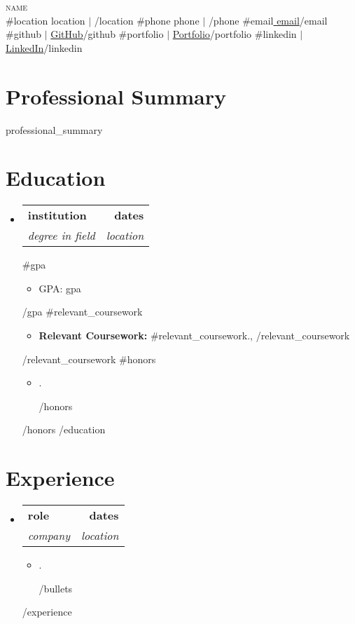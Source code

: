 \documentclass[letterpaper,11pt]{article}
\makeatletter
\newcommand{\resumeItem}[1]{
  \item\small{
    {#1 \vspace{-2pt}}
  }
}
\newcommand{\resumeSubheading}[4]{
  \vspace{-2pt}\item
    \begin{tabular*}{1.0\textwidth}[t]{l@{\extracolsep{\fill}}r}
      \textbf{#1} & \textbf{\small #2} \\
      \textit{\small#3} & \textit{\small #4} \\
    \end{tabular*}\vspace{-7pt}
}
\newcommand{\resumeSubHeadingListStart}{\begin{itemize}[leftmargin=0.0in, label={}]}
\newcommand{\resumeSubHeadingListEnd}{\end{itemize}}
\newcommand{\resumeItemListStart}{\begin{itemize}}
\newcommand{\resumeItemListEnd}{\end{itemize}\vspace{-5pt}}
\makeatother
\begin{document}
\begin{center}
    {\Huge \scshape {{name}}} \\ \vspace{1pt}
    \small
    {{#location}}\faMapMarker* \hspace{1pt} {{location}} $|$ {{/location}}
    {{#phone}}\faPhone* \hspace{1pt} {{phone}} $|$ {{/phone}}
    {{#email}}\href{mailto:{{email}}}{\faEnvelope \hspace{1pt} {{email}}}{{/email}}
    {{#github}} $|$ \href{ {{github}} }{\faGithub \hspace{1pt} GitHub}{{/github}}
    {{#portfolio}} $|$ \href{ {{portfolio}} }{\faGlobe \hspace{1pt} Portfolio}{{/portfolio}}
    {{#linkedin}} $|$ \href{ {{linkedin}} }{\faLinkedin \hspace{1pt} LinkedIn}{{/linkedin}}
    \vspace{-8pt}
\end{center}

\section{Professional Summary}
\small{
{{professional_summary}}
}
\vspace{-5pt}

\section{Education}
  \resumeSubHeadingListStart
    {{#education}}
    \resumeSubheading
      { {{institution}} }{ {{dates}} }
      { {{degree}} in {{field}} }{ {{location}} }
      {{#gpa}}
      \resumeItemListStart
        \resumeItem{GPA: {{gpa}}}
      \resumeItemListEnd
      {{/gpa}}
      {{#relevant_coursework}}
      \resumeItemListStart
        \resumeItem{\textbf{Relevant Coursework:} {{#relevant_coursework}}{{.}}, {{/relevant_coursework}}}
      \resumeItemListEnd
      {{/relevant_coursework}}
      {{#honors}}
      \resumeItemListStart
        {{#honors}}
        \resumeItem{ {{.}} }
        {{/honors}}
      \resumeItemListEnd
      {{/honors}}
    {{/education}}
  \resumeSubHeadingListEnd
\vspace{-10pt}

\section{Experience}
  \resumeSubHeadingListStart
    {{#experience}}
    \resumeSubheading
      { {{role}} }{ {{dates}} }
      { {{company}} }{ {{location}} }
      \resumeItemListStart
        {{#bullets}}
        \resumeItem{ {{.}} }
        {{/bullets}}
      \resumeItemListEnd
    {{/experience}}
  \resumeSubHeadingListEnd
\vspace{-10pt}
\end{document}
